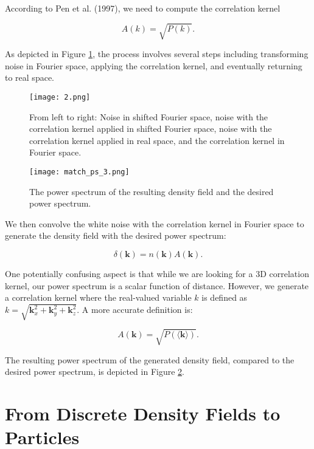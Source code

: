 According to Pen et al. (1997), we need to compute the correlation kernel \citep{}

\begin{equation}
    A(k) = \sqrt{P(k)}.
\end{equation}

As depicted in Figure \ref{fig:correlation-kernel}, the process involves several steps including transforming noise in Fourier space, applying the correlation kernel, and eventually returning to real space.

\begin{figure}[h]
    \centering
    \texttt{[image: 2.png]}
    \caption{From left to right: Noise in shifted Fourier space, noise with the correlation kernel applied in shifted Fourier space, noise with the correlation kernel applied in real space, and the correlation kernel in Fourier space.}
    \label{fig:correlation-kernel}
\end{figure}

\begin{figure}[h]
    \centering
    \texttt{[image: match\_ps\_3.png]}
    \caption{The power spectrum of the resulting density field and the desired power spectrum.}
    \label{fig:result}
\end{figure}


We then convolve the white noise with the correlation kernel in Fourier space to generate the density field with the desired power spectrum:

\begin{equation}
    \delta(\mathbf{k}) = n(\mathbf{k}) A(\mathbf{k}).
\end{equation}

One potentially confusing aspect is that while we are looking for a 3D correlation kernel, our power spectrum is a scalar function of distance. However, we generate a correlation kernel where the real-valued variable \(k\) is defined as \(k = \sqrt{\mathbf{k}_x^2 + \mathbf{k}_y^2 + \mathbf{k}_z^2}\). A more accurate definition is:

\begin{equation}
    A(\mathbf{k}) = \sqrt{P(\langle \mathbf{k} \rangle)}.
\end{equation}

The resulting power spectrum of the generated density field, compared to the desired power spectrum, is depicted in Figure \ref{fig:result}.


\newpage
\section{From Discrete Density Fields to Particles}
\label{back}

